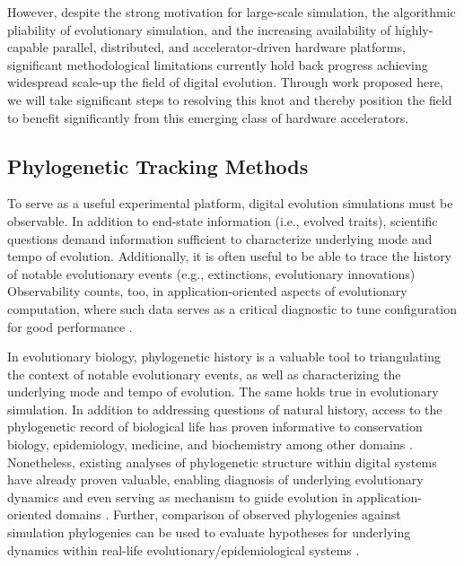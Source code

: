 However, despite the strong motivation for large-scale simulation, the algorithmic pliability of evolutionary simulation, and the increasing availability of highly-capable parallel, distributed, and accelerator-driven hardware platforms, significant methodological limitations currently hold back progress achieving widespread scale-up the field of digital evolution.
Through work proposed here, we will take significant steps to resolving this knot and thereby position the field to benefit significantly from this emerging class of hardware accelerators.

\subsection{Phylogenetic Tracking Methods}

To serve as a useful experimental platform, digital evolution simulations must be observable.
In addition to end-state information (i.e., evolved traits), scientific questions demand information sufficient to characterize underlying mode and tempo of evolution.
Additionally, it is often useful to be able to trace the history of notable evolutionary events (e.g., extinctions, evolutionary innovations)
Observability counts, too, in application-oriented aspects of evolutionary computation, where such data serves as a critical diagnostic to tune configuration for good performance \citep{hernandez2022can}.

In evolutionary biology, phylogenetic history is a valuable tool to triangulating the context of notable evolutionary events, as well as characterizing the underlying mode and tempo of evolution.
The same holds true in evolutionary simulation.
In addition to addressing questions of natural history, access to the phylogenetic record of biological life has proven informative to conservation biology, epidemiology, medicine, and biochemistry among other domains \citep{faithConservationEvaluationPhylogenetic1992, STAMATAKIS2005phylogenetics, frenchHostPhylogenyShapes2023,kim2006discovery}.
Nonetheless, existing analyses of phylogenetic structure within digital systems have already proven valuable, enabling diagnosis of underlying evolutionary dynamics \citep{moreno2023toward,hernandez2022can,shahbandegan2022untangling, lewinsohnStatedependentEvolutionaryModels2023a} and even serving as mechanism to guide evolution in application-oriented domains \citep{lalejini2024phylogeny,lalejini2024runtime,murphy2008simple,burke2003increased}.
Further, comparison of observed phylogenies against simulation phylogenies can be used to evaluate hypotheses for underlying dynamics within real-life evolutionary/epidemiological systems \citep{giardina2017inference,voznica2022deep}.

